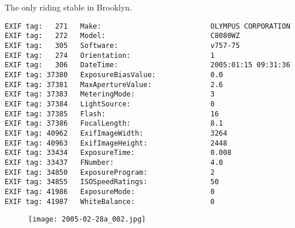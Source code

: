 \section{\protect{}}
\noindent The only riding stable in Brooklyn.
\noindent
\begin{lstlisting}
EXIF tag:   271   Make:                          OLYMPUS CORPORATION
EXIF tag:   272   Model:                         C8080WZ
EXIF tag:   305   Software:                      v757-75
EXIF tag:   274   Orientation:                   1
EXIF tag:   306   DateTime:                      2005:01:15 09:31:36
EXIF tag: 37380   ExposureBiasValue:             0.0
EXIF tag: 37381   MaxApertureValue:              2.6
EXIF tag: 37383   MeteringMode:                  3
EXIF tag: 37384   LightSource:                   0
EXIF tag: 37385   Flash:                         16
EXIF tag: 37386   FocalLength:                   8.1
EXIF tag: 40962   ExifImageWidth:                3264
EXIF tag: 40963   ExifImageHeight:               2448
EXIF tag: 33434   ExposureTime:                  0.008
EXIF tag: 33437   FNumber:                       4.0
EXIF tag: 34850   ExposureProgram:               2
EXIF tag: 34855   ISOSpeedRatings:               50
EXIF tag: 41986   ExposureMode:                  0
EXIF tag: 41987   WhiteBalance:                  0

\end{lstlisting}
\clearpage
\begin{figure}
\raggedleft
\texttt{[image: 2005-02-28a\_002.jpg]}
\end{figure}


\clearpage
